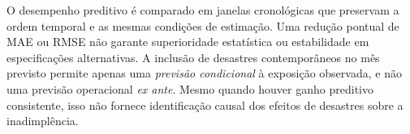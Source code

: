 O desempenho preditivo é comparado em janelas cronológicas que preservam
a ordem temporal e as mesmas condições de estimação. Uma redução pontual
de MAE ou RMSE não garante superioridade estatística ou estabilidade em
especificações alternativas. A inclusão de desastres contemporâneos no
mês previsto permite apenas uma \textit{previsão condicional} à exposição
observada, e não uma previsão operacional \textit{ex ante}. Mesmo quando
houver ganho preditivo consistente, isso não fornece identificação causal
dos efeitos de desastres sobre a inadimplência.